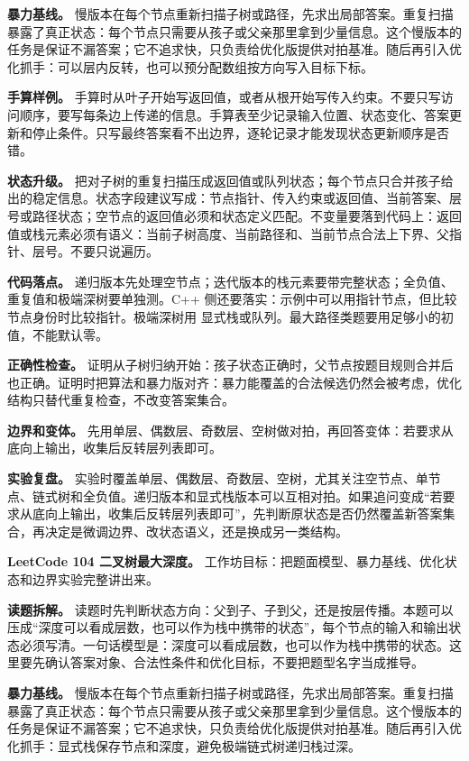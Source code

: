 \textbf{暴力基线。} 慢版本在每个节点重新扫描子树或路径，先求出局部答案。重复扫描暴露了真正状态：每个节点只需要从孩子或父亲那里拿到少量信息。这个慢版本的任务是保证不漏答案；它不追求快，只负责给优化版提供对拍基准。随后再引入优化抓手：可以层内反转，也可以预分配数组按方向写入目标下标。

\textbf{手算样例。} 手算时从叶子开始写返回值，或者从根开始写传入约束。不要只写访问顺序，要写每条边上传递的信息。手算表至少记录输入位置、状态变化、答案更新和停止条件。只写最终答案看不出边界，逐轮记录才能发现状态更新顺序是否错。

\textbf{状态升级。} 把对子树的重复扫描压成返回值或队列状态；每个节点只合并孩子给出的稳定信息。状态字段建议写成：节点指针、传入约束或返回值、当前答案、层号或路径状态；空节点的返回值必须和状态定义匹配。不变量要落到代码上：返回值或栈元素必须有语义：当前子树高度、当前路径和、当前节点合法上下界、父指针、层号。不要只说遍历。

\textbf{代码落点。} 递归版本先处理空节点；迭代版本的栈元素要带完整状态；全负值、重复值和极端深树要单独测。C++ 侧还要落实：示例中可以用指针节点，但比较节点身份时比较指针。极端深树用  显式栈或队列。最大路径类题要用足够小的初值，不能默认零。

\textbf{正确性检查。} 证明从子树归纳开始：孩子状态正确时，父节点按题目规则合并后也正确。证明时把算法和暴力版对齐：暴力能覆盖的合法候选仍然会被考虑，优化结构只替代重复检查，不改变答案集合。

\textbf{边界和变体。} 先用单层、偶数层、奇数层、空树做对拍，再回答变体：若要求从底向上输出，收集后反转层列表即可。

\textbf{实验复盘。} 实验时覆盖单层、偶数层、奇数层、空树，尤其关注空节点、单节点、链式树和全负值。递归版本和显式栈版本可以互相对拍。如果追问变成“若要求从底向上输出，收集后反转层列表即可”，先判断原状态是否仍然覆盖新答案集合，再决定是微调边界、改状态语义，还是换成另一类结构。

\noindent\textbf{LeetCode 104 二叉树最大深度。} 工作坊目标：把题面模型、暴力基线、优化状态和边界实验完整讲出来。

\textbf{读题拆解。} 读题时先判断状态方向：父到子、子到父，还是按层传播。本题可以压成“深度可以看成层数，也可以作为栈中携带的状态”，每个节点的输入和输出状态必须写清。一句话模型是：深度可以看成层数，也可以作为栈中携带的状态。这里要先确认答案对象、合法性条件和优化目标，不要把题型名字当成推导。

\textbf{暴力基线。} 慢版本在每个节点重新扫描子树或路径，先求出局部答案。重复扫描暴露了真正状态：每个节点只需要从孩子或父亲那里拿到少量信息。这个慢版本的任务是保证不漏答案；它不追求快，只负责给优化版提供对拍基准。随后再引入优化抓手：显式栈保存节点和深度，避免极端链式树递归栈过深。

